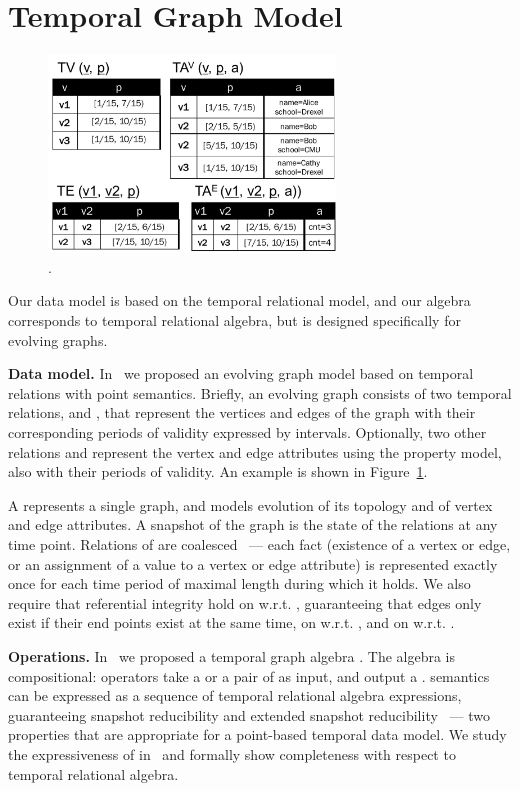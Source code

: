 \section{Temporal Graph Model}
\label{sec:tga}

\begin{figure}[t]
\centering
\includegraphics[width=3in]{figs/T1_rel.pdf}
\caption{\tg {}.}
\label{fig:tg_rel}
\end{figure}

Our data model is based on the temporal relational model, and our
algebra corresponds to temporal relational algebra, but is designed
specifically for evolving graphs.  

{\bf Data model.}  In~\cite{PortalarXiv2016} we proposed an evolving
graph model \tg based on temporal relations with point semantics.
Briefly, an evolving graph consists of two temporal relations,
 and , that represent the vertices and edges of the
graph with their corresponding periods of validity expressed by
intervals.  Optionally, two other relations  and 
represent the vertex and edge attributes using the property model,
also with their periods of validity.  An example is shown in
Figure~\ref{fig:tg_rel}.

A \tg represents a single graph, and models evolution of its topology
and of vertex and edge attributes.  A snapshot of the graph is the
state of the relations at any time point.  Relations of \tg are
coalesced~\cite{DBLP:conf/vldb/BohlenSS96} --- each fact (existence of
a vertex or edge, or an assignment of a value to a vertex or edge
attribute) is represented exactly once for each time period of maximal
length during which it holds.  We also require that referential
integrity hold on  w.r.t. , guaranteeing that edges
only exist if their end points exist at the same time, on 
w.r.t. , and on  w.r.t. .

{\bf Operations.} In~\cite{PortalarXiv2016} we proposed a temporal
graph algebra \tga.  The algebra is compositional: operators take a
\tg or a pair of \tgs as input, and output a \tg.  \tga semantics can
be expressed as a sequence of temporal relational algebra expressions,
guaranteeing snapshot reducibility and extended snapshot
reducibility~\cite{DBLP:reference/db/Bohlen092} --- two properties
that are appropriate for a point-based temporal data model.  We study
the expressiveness of \tga in~\cite{PortalarXiv2016} and formally show
completeness with respect to temporal relational algebra.

